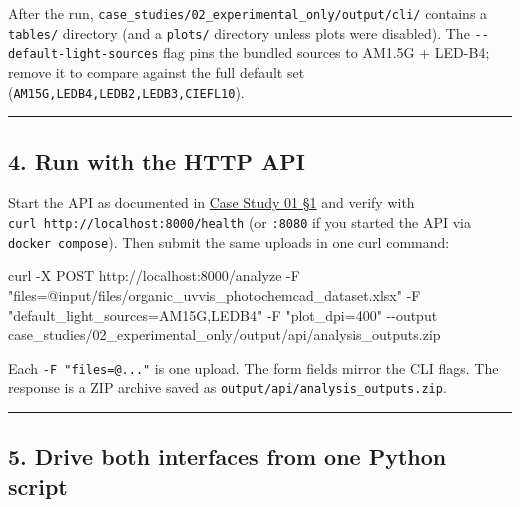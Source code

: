 \documentclass[
  11pt,
]{article}
\newenvironment{Shaded}{}{}
\newcommand{\AttributeTok}[1]{\textcolor[rgb]{0.49,0.56,0.16}{#1}}
\newcommand{\ExtensionTok}[1]{#1}
\newcommand{\NormalTok}[1]{#1}
\newcommand{\StringTok}[1]{\textcolor[rgb]{0.25,0.44,0.63}{#1}}
\begin{document}
After the run, \texttt{case\_studies/02\_experimental\_only/output/cli/}
contains a \texttt{tables/} directory (and a \texttt{plots/} directory
unless plots were disabled). The \texttt{-\/-default-light-sources} flag
pins the bundled sources to AM1.5G + LED-B4; remove it to compare
against the full default set (\texttt{AM15G,LEDB4,LEDB2,LEDB3,CIEFL10}).

\begin{center}\rule{0.5\linewidth}{0.5pt}\end{center}

\hypertarget{4-run-with-the-http-api}{
\subsection{4. Run with the HTTP API}\label{4-run-with-the-http-api}}

Start the API as documented in
\href{https://github.com/pinarsyt/overlap-calculator/blob/main/case_studies/01_theoretical_only/README.md\#1-prerequisites}{Case
Study 01 §1} and verify with
\texttt{curl\ http://localhost:8000/health} (or \texttt{:8080} if you
started the API via \texttt{docker\ compose}). Then submit the same
uploads in one curl command:

\begin{Shaded}
\begin{Highlighting}[]
\ExtensionTok{curl} \AttributeTok{{-}X}\NormalTok{ POST http://localhost:8000/analyze }\AttributeTok{{-}F} \StringTok{"files=@input/files/organic\_uvvis\_photochemcad\_dataset.xlsx"} \AttributeTok{{-}F} \StringTok{"default\_light\_sources=AM15G,LEDB4"} \AttributeTok{{-}F} \StringTok{"plot\_dpi=400"} \AttributeTok{{-}{-}output}\NormalTok{ case\_studies/02\_experimental\_only/output/api/analysis\_outputs.zip}
\end{Highlighting}
\end{Shaded}

Each \texttt{-F\ "files=@..."} is one upload. The form fields mirror the
CLI flags. The response is a ZIP archive saved as
\texttt{output/api/analysis\_outputs.zip}.

\begin{center}\rule{0.5\linewidth}{0.5pt}\end{center}

\hypertarget{5-drive-both-interfaces-from-one-python-script}{
\subsection{5. Drive both interfaces from one Python
script}\label{5-drive-both-interfaces-from-one-python-script}}
\end{document}
